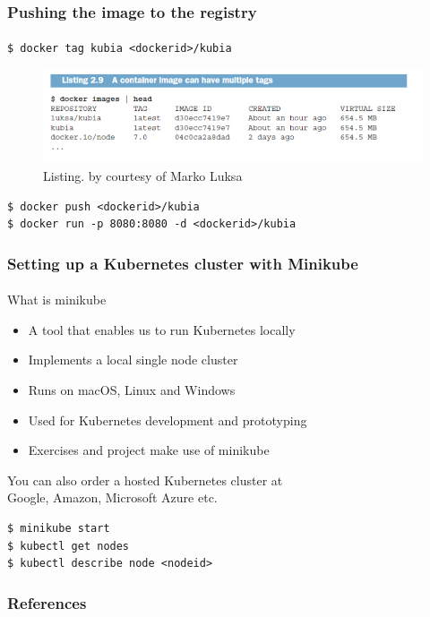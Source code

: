 \begin{frame}[fragile]
	\frametitle{Pushing the image to the registry}
	\framesubtitle{}
	\begin{lstlisting}[numbers=none, basicstyle=\ttfamily]
$ docker tag kubia <dockerid>/kubia
	\end{lstlisting}
	\begin{figure}[htbp!]
		\includegraphics[width=1\textwidth]{listings/2_9.png}
		\caption{Listing. by courtesy of Marko Luksa\cite{Luksa2018}}
		\label{fig:}
	\end{figure}
	\begin{lstlisting}[numbers=none, basicstyle=\ttfamily]
$ docker push <dockerid>/kubia
$ docker run -p 8080:8080 -d <dockerid>/kubia
	\end{lstlisting}
\end{frame}

\begin{frame}[fragile]
	\frametitle{Setting up a Kubernetes cluster with Minikube}
	\framesubtitle{}
	What is minikube
	\begin{itemize}
		\item A tool that enables us to run Kubernetes locally
		\item Implements a local single node cluster
		\item Runs on macOS, Linux and Windows
		\item Used for Kubernetes development and prototyping
		\item Exercises and project make use of minikube
	\end{itemize}
	You can also order a hosted Kubernetes cluster at \\
	Google, Amazon, Microsoft Azure etc.
	\begin{lstlisting}[numbers=none, basicstyle=\ttfamily]
$ minikube start
$ kubectl get nodes
$ kubectl describe node <nodeid>
	\end{lstlisting}
\end{frame}

\begin{frame}[allowframebreaks]
\frametitle{References}
\fontsize{5pt}{5pt}\selectfont
\def\newblock{\hskip .11em plus .33em minus .07em}


\normalsize
\end{frame}

